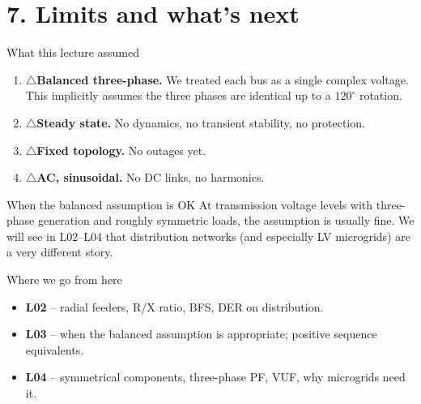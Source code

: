 \documentclass[aspectratio=169,10pt]{beamer}
\newcommand{\warnitem}{\textcolor{warnorange}{\Large$\triangle$}\;}
\begin{document}
\section*{7. Limits and what's next}

\begin{frame}{What this lecture assumed}
\begin{enumerate}
  \item \warnitem \textbf{Balanced three-phase.} We treated each bus as a single complex voltage. This implicitly assumes the three phases are identical up to a $120^\circ$ rotation.
  \item \warnitem \textbf{Steady state.} No dynamics, no transient stability, no protection.
  \item \warnitem \textbf{Fixed topology.} No outages yet.
  \item \warnitem \textbf{AC, sinusoidal.} No DC links, no harmonics.
\end{enumerate}
\vspace{0.5em}
\begin{block}{When the balanced assumption is OK}
At transmission voltage levels with three-phase generation and roughly symmetric loads, the assumption is usually fine. We will see in L02--L04 that distribution networks (and especially LV microgrids) are a very different story.
\end{block}
\end{frame}

\begin{frame}{Where we go from here}
\centering
{}
\vspace{1em}
\begin{itemize}
  \item \textbf{L02} -- radial feeders, R/X ratio, BFS, DER on distribution.
  \item \textbf{L03} -- when the balanced assumption is appropriate; positive sequence equivalents.
  \item \textbf{L04} -- symmetrical components, three-phase PF, VUF, why microgrids need it.
\end{itemize}
\end{frame}
\end{document}
